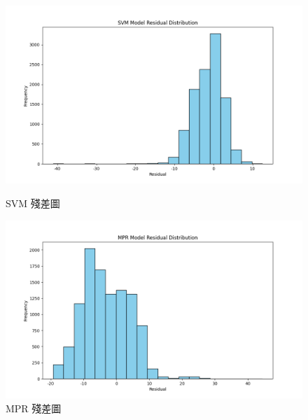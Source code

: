 \documentclass[12pt,a4paper]{article}
\begin{document}
\begin{enumerate}
\begin{enumerate}[label=\arabic*.]
\begin{enumerate}[label=3-2-\arabic*.]
\begin{enumerate}[label=\Alph*.]
\begin{figure}[H]
\begin{minipage}{0.45\textwidth}
                            \includegraphics[width=\textwidth]{resources/image/ResidualPlot/SVM.png}
                            \caption{SVM 殘差圖}
                            \label{fig:residual_svm}
                        \end{minipage}
                        \begin{minipage}{0.45\textwidth}
                            \centering
                            \includegraphics[width=\textwidth]{resources/image/ResidualPlot/MPR.png}
                            \caption{MPR 殘差圖}
                            \label{fig:residual_mpr}
                        \end{minipage}
                        \begin{minipage}{0.45\textwidth}
                            \centering

\end{minipage}
\end{figure}
\end{enumerate}
\end{enumerate}
\end{enumerate}
\end{enumerate}
\end{document}
